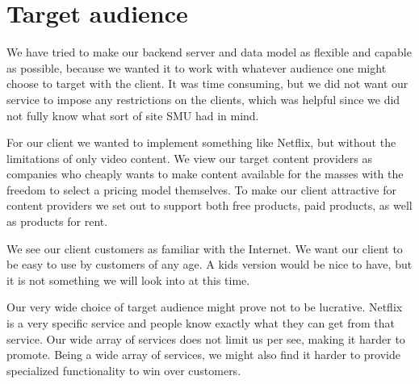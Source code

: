 \section{Target audience}
We have tried to make our backend server and data model as flexible and capable as possible, because we wanted it to work with whatever audience one might choose to target with the client. It was time consuming, but we did not want our service to impose any restrictions on the clients, which was helpful since we did not fully know what sort of site SMU had in mind.

For our client we wanted to implement something like Netflix, but without the limitations of only video content. 
We view our target content providers as companies who cheaply wants to make content available for the masses with the freedom to select a pricing model themselves.
To make our client attractive for content providers we set out to support both free products, paid products, as well as products for rent.

We see our client customers as familiar with the Internet. We want our client to be easy to use by customers of any age. A kids version would be nice to have, but it is not something we will look into at this time.

Our very wide choice of target audience might prove not to be lucrative. Netflix is a very specific service and people know exactly what they can get from that service. Our wide array of services does not limit us per see, making it harder to promote. Being a wide array of services, we might also find it harder to provide specialized functionality to win over customers.
\newpage
